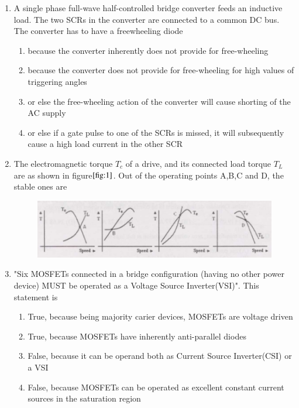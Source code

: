 \documentclass[journal]{IEEEtran}
\numberwithin{equation}{enumi}
\numberwithin{figure}{enumi}
\begin{document}
\begin{enumerate}
    \item A single phase full-wave half-controlled bridge converter feeds an inductive load. The two SCRs in the converter are connected to a common DC bus. The converter has to have a freewheeling diode 
    \begin{enumerate}
            \item because the converter inherently does not provide for free-wheeling
            \item because the converter does not provide for free-wheeling for high values of triggering angles
             \item or else the free-wheeling action of the converter will cause shorting of the AC supply
            \item or else if a gate pulse  to one of the SCRs is missed, it will subsequently cause a high load current in the other SCR
    \end{enumerate}
    \bigskip
\item The electromagnetic torque $T_c$ of a drive, and its connected load torque $T_L$ are as shown in figure$\ref{fig:1}$. Out of the operating points A,B,C and D, the stable ones are
\begin{figure}[!ht]
    \centering
    \includegraphics[width=\linewidth]{figs/1.png}
    \caption{}
    \label{fig:1}
    \end{figure}
\begin{enumerate}
\end{enumerate}
\bigskip
\item "Six MOSFETs connected in a bridge configuration (having no other power device) MUST be operated as a Voltage Source Inverter(VSI)". This statement is
\begin{enumerate}
    \item True, because being majority carier devices, MOSFETs are voltage driven
    \item True, because MOSFETs have inherently anti-parallel diodes 
    \item False, because it can be operand both as Current Source Inverter(CSI) or a VSI
    \item False, because MOSFETs can be operated as excellent constant current sources in the saturation region

\end{enumerate}
\end{enumerate}
\end{document}
